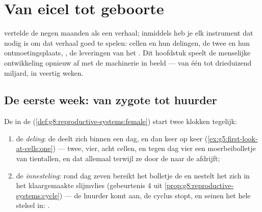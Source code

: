 \chapter{Van eicel tot geboorte}\label{ch:g8:from-egg-to-birth}

 vertelde de negen maanden als een verhaal;
inmiddels heb je elk instrument dat nodig is om dat verhaal goed te
spelen: cellen en hun delingen, de twee  en hun ontmoetingsplaats,
, de leveringen van het . Dit hoofdstuk speelt de menselijke
ontwikkeling opnieuw af met de machinerie in beeld --- van één  tot
drieduizend miljard, in veertig weken.

\section{De eerste week: van zygote tot huurder}

\begin{proposition}\label{prop:g8:from-egg-to-birth:firstweek}
De  in de 
(\cref{def:g8:reproductive-systems:female}) start twee klokken tegelijk:
\begin{enumerate}
  \item de \emph{deling}: de  deelt zich binnen een dag, en dan
        keer op keer (\cref{ex:g5:first-look-at-cells:one}) --- twee,
        vier, acht cellen, en tegen dag vier een moerbeibolletje van
        tientallen, en dat allemaal terwijl ze door de  naar de
         afdrijft;
  \item de \emph{innesteling}: rond dag zeven bereikt het bolletje de
         en nestelt het zich in het klaargemaakte slijmvlies
        (gebeurtenis 4 uit
        \cref{prop:g8:reproductive-systems:cycle}) --- de huurder komt
        aan, de cyclus stopt, en  seinen het hele stelsel in:
        .
\end{enumerate}
\end{proposition}
\admitted

